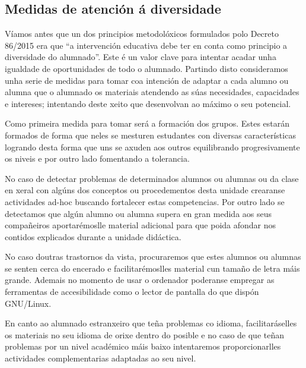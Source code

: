 \subsection{Medidas de atención á diversidade}\label{sec:diversidade}

Víamos antes que un dos principios metodolóxicos formulados polo Decreto 86/2015 era que ``a intervención educativa debe ter en conta como principio a diversidade do alumnado''. Este é un valor clave para intentar acadar unha igualdade de oportunidades de todo o alumnado. Partindo disto consideramos unha serie de medidas para tomar coa intención de adaptar a cada alumno ou alumna que o alumnado os materiais atendendo as súas necesidades, capacidades e intereses; intentando deste xeito que desenvolvan ao máximo o seu potencial.

Como primeira medida para tomar será a formación dos grupos. Estes estarán formados de forma que neles se mesturen estudantes con diversas características logrando desta forma que uns se axuden aos outros equilibrando progresivamente os niveis e por outro lado fomentando a tolerancia.

No caso de detectar problemas de determinados alumnos ou alumnas ou da clase en xeral con algúns dos conceptos ou procedementos desta unidade crearanse actividades ad-hoc buscando fortalecer estas competencias. Por outro lado se detectamos que algún alumno ou alumna supera en gran medida aos seus compañeiros aportarémoslle material adicional para que poida afondar nos contidos explicados durante a unidade didáctica.

No caso doutras trastornos da vista, procuraremos que estes alumnos ou alumnas se senten cerca do encerado e facilitarémoslles material cun tamaño de letra máis grande. Ademais no momento de usar o ordenador poderanse empregar as ferramentas de accesibilidade como o lector de pantalla do que dispón GNU/Linux.

En canto ao alumnado estranxeiro que teña problemas co idioma, facilitaráselles os materiais no seu idioma de orixe dentro do posible e no caso de que teñan problemas por un nivel académico máis baixo intentaremos proporcionarlles actividades complementarias adaptadas ao seu nivel.
